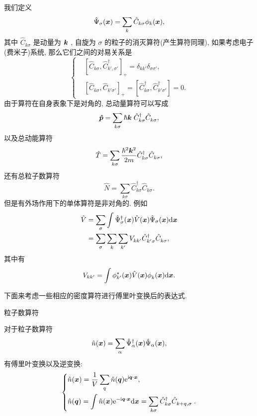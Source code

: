 我们定义
\begin{equation}
   \hat\Psi_{\sigma}(\boldsymbol{x})=\sum_k\hat C_{ k{\sigma}}\phi_{ k}(\boldsymbol{x}), 
\end{equation}
 其中 $\hat C_{ k{\sigma}}$ 是动量为 $\boldsymbol{k}$ , 自旋为 ${\sigma}$ 的粒子的消灭算符(产生算符同理), 如果考虑电子(费米子)系统, 那么它们之间的对易关系是
\begin{equation}
   \left\{
\begin{aligned}
&\left[ \hat C_{ k{\sigma}}^{ }, \hat C_{ k', {\sigma}'}^\dagger \right]_+=\delta_{{kk}'}\delta_{{\sigma}{\sigma}'}, \\
&\left[ \hat C^{}_{ k{\sigma}}, \hat C_{ k'{\sigma}'} \right]_+=\left[ \hat C_{ k{\sigma}}^\dagger, \hat C_{ k'{\sigma}'}^\dagger \right]=0. 
\end{aligned}
\right. 
\end{equation}
由于算符在自身表象下是对角的, 总动量算符可以写成
\begin{equation}
   \boldsymbol{\hat p}=\sum_{ k{\sigma}}\hbar\boldsymbol{k}\;\hat C_{ k{\sigma}}^\dagger\hat C_{ k{\sigma}}^{ }, 
\end{equation}
以及总动能算符
\begin{equation}
   \hat T=\sum_{k{\sigma}}\frac{\hbar^2\boldsymbol{k}^2}{2m}\hat C_{ k{\sigma}}^\dagger \hat C_{ k{\sigma}}^{}, 
\end{equation}
还有总粒子数算符
\begin{equation}
   \hat N=\sum_{ k{\sigma}}\hat C_{ k{\sigma}}^\dagger \hat C_{ k{\sigma}}^{}. 
\end{equation}
但是有外场作用下的单体算符是非对角的. 例如
\begin{align}
      \hat V&=\sum_\sigma \int\hat\Psi_\sigma^\dagger(\boldsymbol{x})\hat{V}(\boldsymbol{x})\hat{\Psi}_\sigma(\boldsymbol{x})\mathrm{d}\boldsymbol{x}\nonumber\\
      &=\sum_\sigma\sum_{ k}\sum_{k'}V^{}_{kk'}\hat C_{ k'\sigma}^\dagger\hat C^{}_{ k\sigma}, 
   \end{align}
其中有
\begin{equation}
   V_{{kk'}}=\int \phi^*_{ k'}(\boldsymbol{x})\hat V(\boldsymbol{x})\phi^{}_k(\boldsymbol{x})\mathrm{d}\boldsymbol{x}. 
\end{equation}

下面来考虑一些相应的密度算符进行傅里叶变换后的表达式. 

\begin{example}粒子数算符

对于粒子数算符 
\begin{equation}
   \hat n(\boldsymbol{x})=\sum_\alpha\hat \Psi_\alpha^\dagger(\boldsymbol{x})\hat\Psi_\alpha(\boldsymbol{x}), 
\end{equation}
有傅里叶变换以及逆变换: 
\begin{equation}
   \left\{
\begin{aligned}
&\hat n(\boldsymbol{x})=\frac{1}{V}\sum_{ q}\hat n(\boldsymbol{q})\mathrm e^{\mathrm i\boldsymbol{q}\cdot \boldsymbol{x}}, \\
&\hat n(\boldsymbol{q})=\int \hat n(\boldsymbol{x})\mathrm e^{-\mathrm i\boldsymbol{q}\cdot\boldsymbol{x}}\mathrm d\boldsymbol{x}=\sum_{ k{\sigma}}\hat C_{ k{\sigma}}^\dagger\hat C_{{k+q}, {\sigma}}^{}\;. 
\end{aligned}
\right. 
\end{equation}
\end{example}

